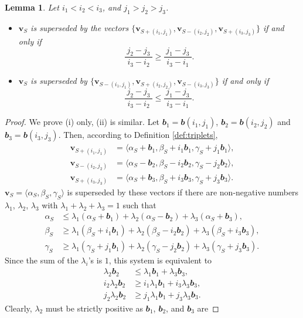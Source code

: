 \documentclass[reqno]{amsart}
\newtheorem{lemma}[theorem]{Lemma}
\theoremstyle{definition}
\renewcommand\ge{\geqslant}\renewcommand\le{\leqslant}
\def\<{\langle}\def\>{\rangle}
\def\b{\mathbfit b}
\begin{document}
\begin{lemma}\label{lemma:convex}
Let $i_1<i_2<i_3$, and $j_1>j_2>j_3$.
\begin{itemize}
\item[(i)] $\mathbf v_S$ is
superseded by the vectors $\{\mathbf v_{S+(i_1,j_1)},
\mathbf v_{S-(i_2,j_2)}, \mathbf v_{S+(i_3,j_3)} \}$ if and only if
$$
    \frac{~j_2-j_3~}{i_3-i_2} \ge \frac{~j_1-j_3~}{i_3-i_1}.
$$
\item[(ii)] $\mathbf v_S$ is superseded by
$\{\mathbf v_{S-(i_1,j_1)}, \mathbf v_{S+(i_2,j_2)}, \mathbf
v_{S-(i_3,j_3)} \}$ if and only if
$$
    \frac{~j_2-j_3~}{i_3-i_2} \le \frac{~j_1-j_3~}{i_3-i_1}.
$$
\end{itemize}
\end{lemma}
\begin{proof}
We prove (i) only, (ii) is similar. Let $\b_1=\b(i_1,j_1)$,
$\b_2=\b(i_2,j_2)$ and $\b_3=\b(i_3,j_3)$. Then, according to Definition
\ref{def:triplets},
\begin{align*}
  \mathbf v_{S+(i_1,j_1)} &= \<\alpha_S+\b_1,\beta_S+i_1\b_1,\gamma_S+j_1\b_1\>, \\
  \mathbf v_{S-(i_2,j_2)} &= \<\alpha_S-\b_2,\beta_S-i_2\b_2,\gamma_S-j_2\b_2\>, \\
  \mathbf v_{S+(i_3,j_3)} &= \<\alpha_S+\b_3,\beta_S+i_3\b_3,\gamma_S+j_3\b_3\>.
\end{align*}
$\mathbf v_S=\<\alpha_S,\beta_S,\gamma_S\>$ is superseded by these vectors
if there are non-negative numbers $\lambda_1$,
$\lambda_2$, $\lambda_3$ with $\lambda_1+\lambda_2+\lambda_3=1$ such that
\begin{align*}
   \alpha_S &\le \lambda_1(\alpha_S+\b_1) + \lambda_2(\alpha_S-\b_2) + \lambda_3(\alpha_S+\b_3), \\
   \beta_S &\ge \lambda_1(\beta_S+i_1\b_1)+\lambda_2(\beta_S-i_2\b_2)+\lambda_3(\beta_S+i_3\b_3), \\
   \gamma_S &\ge \lambda_1(\gamma_S+j_1\b_1)+\lambda_2(\gamma_S-j_2\b_2)+\lambda_3(\gamma_S+j_3\b_3).
\end{align*}
Since the sum of the $\lambda_i$'s is $1$, this system is equivalent to
\begin{align*}
   \lambda_2\b_2 &\le \lambda_1\b_1+\lambda_3\b_3, \\
   i_2\lambda_2\b_2 &\ge i_1\lambda_1\b_1 + i_3\lambda_3\b_3, \\
   j_2\lambda_2\b_2 &\ge j_1\lambda_1\b_1 + j_3\lambda_3\b_3.
\end{align*}
Clearly, $\lambda_2$ must be strictly positive as $\b_1$, $\b_2$, and $\b_3$ are

\end{proof}
\end{document}
